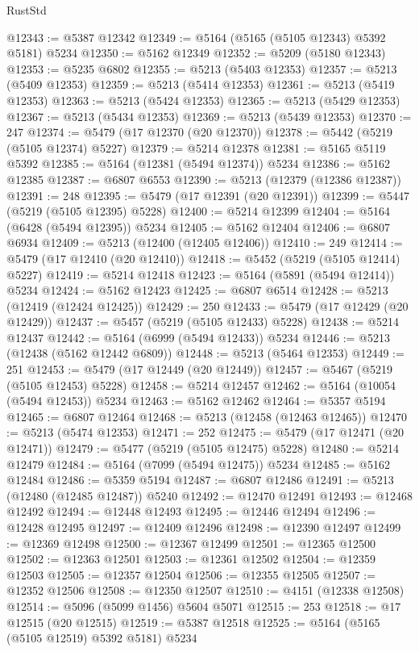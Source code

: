 \begin{lexlean}{RustStd}
\begin{coremodule}
@12343 := @5387 @12342
@12349 := @5164 (@5165 (@5105 @12343) @5392 @5181) @5234
@12350 := @5162 @12349
@12352 := @5209 (@5180 @12343)
@12353 := @5235 @6802
@12355 := @5213 (@5403 @12353)
@12357 := @5213 (@5409 @12353)
@12359 := @5213 (@5414 @12353)
@12361 := @5213 (@5419 @12353)
@12363 := @5213 (@5424 @12353)
@12365 := @5213 (@5429 @12353)
@12367 := @5213 (@5434 @12353)
@12369 := @5213 (@5439 @12353)
@12370 := 247
@12374 := @5479 (@17 @12370 (@20 @12370))
@12378 := @5442 (@5219 (@5105 @12374) @5227)
@12379 := @5214 @12378
@12381 := @5165 @5119 @5392
@12385 := @5164 (@12381 (@5494 @12374)) @5234
@12386 := @5162 @12385
@12387 := @6807 @6553
@12390 := @5213 (@12379 (@12386 @12387))
@12391 := 248
@12395 := @5479 (@17 @12391 (@20 @12391))
@12399 := @5447 (@5219 (@5105 @12395) @5228)
@12400 := @5214 @12399
@12404 := @5164 (@6428 (@5494 @12395)) @5234
@12405 := @5162 @12404
@12406 := @6807 @6934
@12409 := @5213 (@12400 (@12405 @12406))
@12410 := 249
@12414 := @5479 (@17 @12410 (@20 @12410))
@12418 := @5452 (@5219 (@5105 @12414) @5227)
@12419 := @5214 @12418
@12423 := @5164 (@5891 (@5494 @12414)) @5234
@12424 := @5162 @12423
@12425 := @6807 @6514
@12428 := @5213 (@12419 (@12424 @12425))
@12429 := 250
@12433 := @5479 (@17 @12429 (@20 @12429))
@12437 := @5457 (@5219 (@5105 @12433) @5228)
@12438 := @5214 @12437
@12442 := @5164 (@6999 (@5494 @12433)) @5234
@12446 := @5213 (@12438 (@5162 @12442 @6809))
@12448 := @5213 (@5464 @12353)
@12449 := 251
@12453 := @5479 (@17 @12449 (@20 @12449))
@12457 := @5467 (@5219 (@5105 @12453) @5228)
@12458 := @5214 @12457
@12462 := @5164 (@10054 (@5494 @12453)) @5234
@12463 := @5162 @12462
@12464 := @5357 @5194
@12465 := @6807 @12464
@12468 := @5213 (@12458 (@12463 @12465))
@12470 := @5213 (@5474 @12353)
@12471 := 252
@12475 := @5479 (@17 @12471 (@20 @12471))
@12479 := @5477 (@5219 (@5105 @12475) @5228)
@12480 := @5214 @12479
@12484 := @5164 (@7099 (@5494 @12475)) @5234
@12485 := @5162 @12484
@12486 := @5359 @5194
@12487 := @6807 @12486
@12491 := @5213 (@12480 (@12485 @12487)) @5240
@12492 := @12470 @12491
@12493 := @12468 @12492
@12494 := @12448 @12493
@12495 := @12446 @12494
@12496 := @12428 @12495
@12497 := @12409 @12496
@12498 := @12390 @12497
@12499 := @12369 @12498
@12500 := @12367 @12499
@12501 := @12365 @12500
@12502 := @12363 @12501
@12503 := @12361 @12502
@12504 := @12359 @12503
@12505 := @12357 @12504
@12506 := @12355 @12505
@12507 := @12352 @12506
@12508 := @12350 @12507
@12510 := @4151 (@12338 @12508)
@12514 := @5096 (@5099 @1456) @5604 @5071
@12515 := 253
@12518 := @17 @12515 (@20 @12515)
@12519 := @5387 @12518
@12525 := @5164 (@5165 (@5105 @12519) @5392 @5181) @5234

\end{coremodule}
\end{lexlean}
